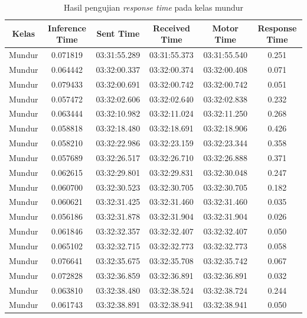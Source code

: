 \begin{longtable}{|c|c|c|c|c|c|}
  \caption{Hasil pengujian \emph{response time} pada kelas mundur} 
  \label{tb:delaymundur} \\
  \hline
  \rowcolor[HTML]{C0C0C0} 
      \textbf{Kelas} & \textbf{Inference Time} & \textbf{Sent Time} & \textbf{Received Time} & \textbf{Motor Time} & \textbf{Response Time} \\ \hline
      Mundur & 0.071819 & 03:31:55.289 & 03:31:55.373 & 03:31:55.540 & 0.251 \\ \hline
      Mundur & 0.064442 & 03:32:00.337 & 03:32:00.374 & 03:32:00.408 & 0.071 \\ \hline
      Mundur & 0.079433 & 03:32:00.691 & 03:32:00.742 & 03:32:00.742 & 0.051 \\ \hline
      Mundur & 0.057472 & 03:32:02.606 & 03:32:02.640 & 03:32:02.838 & 0.232 \\ \hline
      Mundur & 0.063444 & 03:32:10.982 & 03:32:11.024 & 03:32:11.250 & 0.268 \\ \hline
      Mundur & 0.058818 & 03:32:18.480 & 03:32:18.691 & 03:32:18.906 & 0.426 \\ \hline
      Mundur & 0.058210 & 03:32:22.986 & 03:32:23.159  & 03:32:23.344 & 0.358 \\ \hline
      Mundur & 0.057689 & 03:32:26.517 & 03:32:26.710 & 03:32:26.888 & 0.371 \\ \hline
      Mundur & 0.062615 & 03:32:29.801 & 03:32:29.831 & 03:32:30.048 & 0.247 \\ \hline
      Mundur & 0.060700 & 03:32:30.523 & 03:32:30.705 & 03:32:30.705 & 0.182 \\ \hline
      Mundur & 0.060621 & 03:32:31.425 & 03:32:31.460 & 03:32:31.460 & 0.035 \\ \hline
      Mundur & 0.056186 & 03:32:31.878 & 03:32:31.904 & 03:32:31.904 & 0.026 \\ \hline
      Mundur & 0.061846 & 03:32:32.357 & 03:32:32.407  & 03:32:32.407  & 0.050 \\ \hline
      Mundur & 0.065102 & 03:32:32.715 & 03:32:32.773 & 03:32:32.773 & 0.058 \\ \hline
      Mundur & 0.076641 & 03:32:35.675 & 03:32:35.708 & 03:32:35.742 & 0.067 \\ \hline
      Mundur & 0.072828 & 03:32:36.859 & 03:32:36.891 & 03:32:36.891 & 0.032 \\ \hline
      Mundur & 0.063810 & 03:32:38.480 & 03:32:38.524 & 03:32:38.724 & 0.244 \\ \hline
      Mundur & 0.061743 & 03:32:38.891 & 03:32:38.941 & 03:32:38.941 & 0.050 \\ \hline

\end{longtable}
